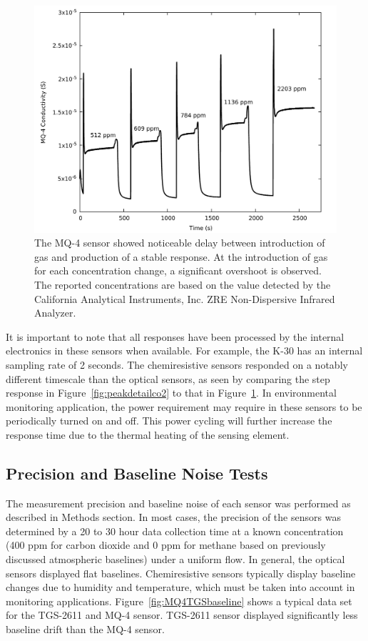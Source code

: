 \documentclass[times]{joehreview}
\begin{document}
	\begin{figure}[!t]
		\centering
		\includegraphics[width=\columnwidth]{honey6.pdf}
		\caption{The MQ-4 sensor showed noticeable delay between introduction of gas and production of a stable response.  At the introduction of gas for each concentration change, a significant overshoot is observed.  The reported concentrations are based on the value detected by the California Analytical Instruments, Inc. ZRE Non-Dispersive Infrared Analyzer.}
		\label{fig:mq4step}
	\end{figure}
	
	It is important to note that all responses have been processed by the internal electronics in these sensors when available.  For example, the K-30 has an internal sampling rate of 2 seconds.  The chemiresistive sensors responded on a notably different timescale than the optical sensors, as seen by comparing the step response in Figure~\ref{fig:peakdetailco2} to that in Figure~\ref{fig:mq4step}.  In environmental monitoring application, the power requirement may require in these sensors to be periodically turned on and off.  This power cycling will further increase the response time due to the thermal heating of the sensing element.  
	
	
	\subsection*{Precision and Baseline Noise Tests}
	\label{sec:main_baseline}
	The measurement precision and baseline noise of each sensor was performed as described in Methods section.  In most cases, the precision of the sensors was determined by a 20 to 30 hour data collection time at a known concentration (400 ppm for carbon dioxide and 0 ppm for methane based on previously discussed atmospheric baselines) under a uniform flow.  In general, the optical sensors displayed flat baselines. Chemiresistive sensors typically display baseline changes due to humidity and temperature, which must be taken into account in monitoring applications. Figure~\ref{fig:MQ4TGSbaseline} shows a typical data set for the TGS-2611 and MQ-4 sensor.  TGS-2611 sensor displayed significantly less baseline drift than the MQ-4 sensor.
	
\end{document}
